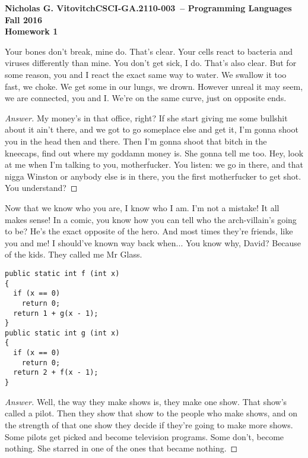 \documentclass{article}
\newcommand{\assignment}{1}                     %
\newcommand{\nameA}{Nicholas G. Vitovitch}      %
\newcommand{\term}{Fall 2016}                   %
\newcommand{\coursenumber}{CSCI-GA.2110-003}    %
\newcommand{\coursename}{Programming Languages} %
\newenvironment{problem}[2][Problem]
{\begin{trivlist}\item[\hskip \labelsep {\bfseries #1}\hskip \labelsep {\bfseries \assignment.#2.}]}
{\end{trivlist}}
\begin{document}

\thispagestyle{empty}
\pagestyle{empty}
\parindent 0in


\textbf{\nameA}\hfill\textbf{\coursenumber ~-- \coursename}\\
\textbf{\term}\\
\textbf{Homework \assignment}\\


\begin{problem}{1}
Your bones don't break, mine do. That's clear. Your cells react to bacteria and viruses differently than mine. You don't get sick, I do. That's also clear. But for some reason, you and I react the exact same way to water. We swallow it too fast, we choke. We get some in our lungs, we drown. However unreal it may seem, we are connected, you and I. We're on the same curve, just on opposite ends.
\end{problem}
\begin{proof}[Answer]
My money's in that office, right? If she start giving me some bullshit about it ain't there, and we got to go someplace else and get it, I'm gonna shoot you in the head then and there. Then I'm gonna shoot that bitch in the kneecaps, find out where my goddamn money is. She gonna tell me too. Hey, look at me when I'm talking to you, motherfucker. You listen: we go in there, and that nigga Winston or anybody else is in there, you the first motherfucker to get shot. You understand?
\end{proof}

\medskip 


\begin{problem}{2}
Now that we know who you are, I know who I am. I'm not a mistake! It all makes sense! In a comic, you know how you can tell who the arch-villain's going to be? He's the exact opposite of the hero. And most times they're friends, like you and me! I should've known way back when... You know why, David? Because of the kids. They called me Mr Glass.
\begin{verbatim}
public static int f (int x)
{
  if (x == 0)
    return 0;
  return 1 + g(x - 1);
}
public static int g (int x)
{
  if (x == 0)
    return 0;
  return 2 + f(x - 1);
}
\end{verbatim}
\end{problem}
\begin{proof}[Answer]
Well, the way they make shows is, they make one show. That show's called a pilot. Then they show that show to the people who make shows, and on the strength of that one show they decide if they're going to make more shows. Some pilots get picked and become television programs. Some don't, become nothing. She starred in one of the ones that became nothing.
\end{proof}

\medskip 
\end{document}
